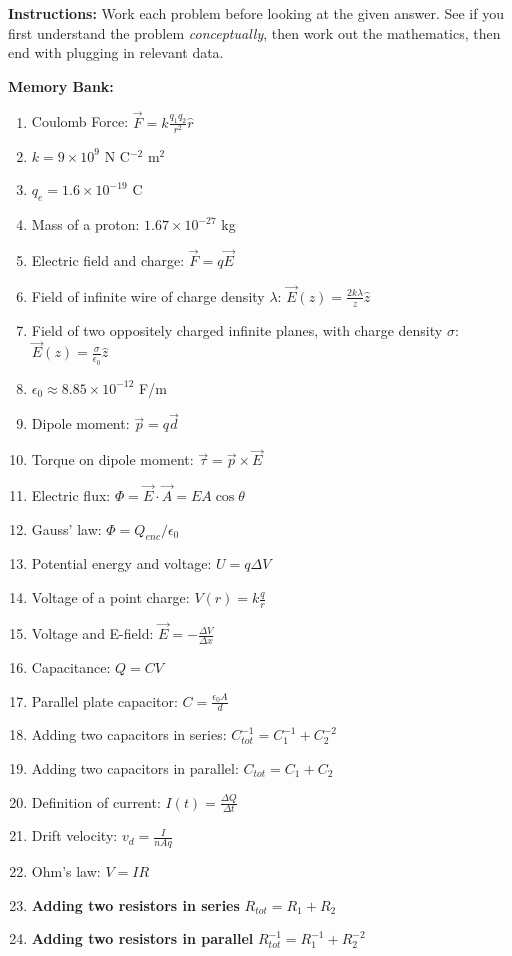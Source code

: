 \documentclass[10pt]{article}
\begin{document}
\maketitle

\textbf{Instructions:} Work each problem before looking at the given answer.  See if you first understand the problem \textit{conceptually}, then work out the mathematics, then end with plugging in relevant data. \\ \vspace{0.25cm}

\textbf{Memory Bank:}
\begin{enumerate}
\item Coulomb Force: $\vec{F} = k \frac{q_1 q_2}{r^2}\hat{r}$
\item $k = 9 \times 10^{9}$ N C$^{-2}$ m$^{2}$
\item $q_e = 1.6 \times 10^{-19}$ C
\item Mass of a proton: $1.67 \times 10^{-27}$ kg
\item Electric field and charge: $\vec{F} = q \vec{E}$
\item Field of infinite wire of charge density $\lambda$: $\vec{E}(z) = \frac{2k\lambda}{z}\hat{z}$
\item Field of two oppositely charged infinite planes, with charge density $\sigma$: $\vec{E}(z) = \frac{\sigma}{\epsilon_0}\hat{z}$
\item $\epsilon_0 \approx 8.85 \times 10^{-12}$ F/m
\item Dipole moment: $\vec{p} = q \vec{d}$
\item Torque on dipole moment: $\vec{\tau} = \vec{p} \times \vec{E}$
\item Electric flux: $\Phi = \vec{E} \cdot \vec{A} = EA \cos\theta$
\item Gauss' law: $\Phi = Q_{enc}/\epsilon_0$
\item Potential energy and voltage: $U = q\Delta V$
\item Voltage of a point charge: $V(r) = k\frac{q}{r}$
\item Voltage and E-field: $\vec{E} = -\frac{\Delta V}{\Delta x}$
\item Capacitance: $Q = CV$
\item Parallel plate capacitor: $C = \frac{\epsilon_0 A}{d}$
\item Adding two capacitors in series: $C_{tot}^{-1} = C_1^{-1} + C_2^{-2}$
\item Adding two capacitors in parallel: $C_{tot} = C_1 + C_2$
\item Definition of current: $I(t) = \frac{\Delta Q}{\Delta t}$
\item Drift velocity: $v_d = \frac{I}{nAq}$
\item Ohm's law: $V = IR$
\item \textbf{Adding two resistors in series} $R_{tot} = R_1 + R_2$
\item \textbf{Adding two resistors in parallel} $R_{tot}^{-1} = R_1^{-1} + R_2^{-2}$
\end{enumerate}
\end{document}
